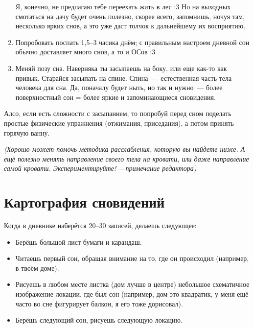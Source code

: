 \documentclass[a5paper,12pt,twoside]{memoir}
\begin{document}
\begin{enumerate}
Я, конечно, не предлагаю тебе переехать жить в лес :3 Но на выходных смотаться на дачу будет очень полезно, скорее всего, запомнишь, ночуя там, несколько ярких снов, а это уже даст толчок к дальнейшему их восприятию.  
\item Попробовать поспать 1,5--3 часика днём; с правильным настроем дневной сон обычно доставляет много снов, а то и ОСов :3
\item Меняй позу сна. Наверняка ты засыпаешь на боку, или еще как-то как привык. Старайся засыпать на спине. Спина~--- естественная часть тела человека для сна. Да, поначалу будет ныть, но так и нужно~--- более поверхностный сон = более яркие и запоминающиеся сновидения. 
\end{enumerate}

Алсо, если есть сложности с засыпанием, то попробуй перед сном поделать простые физические упражнения (отжимания, приседания), а потом принять горячую ванну. 

\textit{(Хорошо может помочь методика расслабления, которую вы найдете ниже. А ещё полезно менять направление своего тела на кровати, или даже направление самой кровати. Экспериментируйте! ---примечание редактора)}






\chapter{Картография сновидений}
Когда в дневнике наберётся 20--30 записей, делаешь следующее:
\begin{itemize}
\item Берёшь большой лист бумаги и карандаш.
\item Читаешь первый сон, обращая внимание на то, где он происходил (например, в твоём доме).
\item Рисуешь в любом месте листка (дом лучше в центре) небольшое схематичное изображение локации, где был сон (например, дом это квадратик, у меня ещё часто во сне фигурирует балкон, я его тоже дорисовал).
\item Берёшь следующий сон, рисуешь следующую локацию.
\end{itemize}
\end{document}
